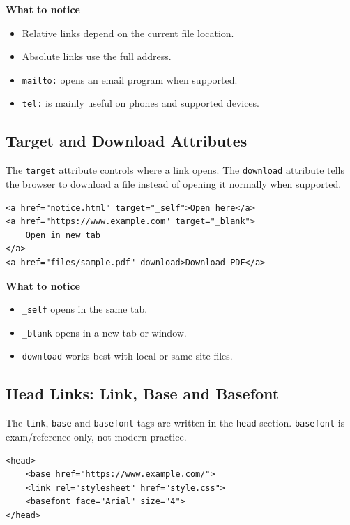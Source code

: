 \textbf{What to notice}
\begin{itemize}
    \item Relative links depend on the current file location.
    \item Absolute links use the full address.
    \item \texttt{mailto:} opens an email program when supported.
    \item \texttt{tel:} is mainly useful on phones and supported devices.
\end{itemize}

\subsection{Target and Download Attributes}
The \texttt{target} attribute controls where a link opens. The \texttt{download} attribute tells the browser to download a file instead of opening it normally when supported.

\begin{lstlisting}[style=htmlide, caption={Target and Download Links}]
<a href="notice.html" target="_self">Open here</a>
<a href="https://www.example.com" target="_blank">
    Open in new tab
</a>
<a href="files/sample.pdf" download>Download PDF</a>
\end{lstlisting}

\textbf{What to notice}
\begin{itemize}
    \item \texttt{\_self} opens in the same tab.
    \item \texttt{\_blank} opens in a new tab or window.
    \item \texttt{download} works best with local or same-site files.
\end{itemize}

\subsection{Head Links: Link, Base and Basefont}
The \texttt{link}, \texttt{base} and \texttt{basefont} tags are written in the \texttt{head} section. \texttt{basefont} is exam/reference only, not modern practice.

\begin{lstlisting}[style=htmlide, caption={Head Link Tags}]
<head>
    <base href="https://www.example.com/">
    <link rel="stylesheet" href="style.css">
    <basefont face="Arial" size="4">
</head>
\end{lstlisting}

